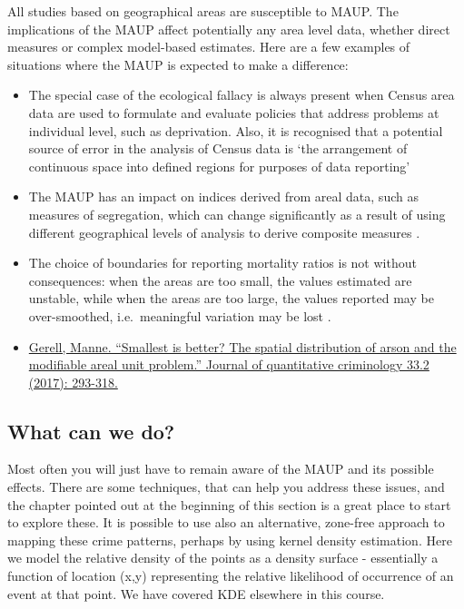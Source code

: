 \documentclass[
]{book}
\providecommand{\tightlist}{%
  \setlength{\itemsep}{0pt}\setlength{\parskip}{0pt}}
\begin{document}
All studies based on geographical areas are susceptible to MAUP. The implications of the MAUP affect potentially any area level data, whether direct measures or complex model-based estimates. Here are a few examples of situations where the MAUP is expected to make a difference:

\begin{itemize}
\tightlist
\item
  The special case of the ecological fallacy is always present when Census area data are used to formulate and evaluate policies that address problems at individual level, such as deprivation. Also, it is recognised that a potential source of error in the analysis of Census data is `the arrangement of continuous space into defined regions for purposes of data reporting'
\item
  The MAUP has an impact on indices derived from areal data, such as measures of segregation, which can change significantly as a result of using different geographical levels of analysis to derive composite measures .
\item
  The choice of boundaries for reporting mortality ratios is not without consequences: when the areas are too small, the values estimated are unstable, while when the areas are too large, the values reported may be over-smoothed, i.e.~meaningful variation may be lost .
\item
  \href{https://link.springer.com/article/10.1007/s10940-016-9297-6}{Gerell, Manne. ``Smallest is better? The spatial distribution of arson and the modifiable areal unit problem.'' Journal of quantitative criminology 33.2 (2017): 293-318.}
\end{itemize}

\hypertarget{what-can-we-do}{%
\subsection{What can we do?}\label{what-can-we-do}}

Most often you will just have to remain aware of the MAUP and its possible effects. There are some techniques, that can help you address these issues, and the chapter pointed out at the beginning of this section is a great place to start to explore these. It is possible to use also an alternative, zone-free approach to mapping these crime patterns, perhaps by using kernel density estimation. Here we model the relative density of the points as a density surface - essentially a function of location (x,y) representing the relative likelihood of occurrence of an event at that point. We have covered KDE elsewhere in this course.
\end{document}
